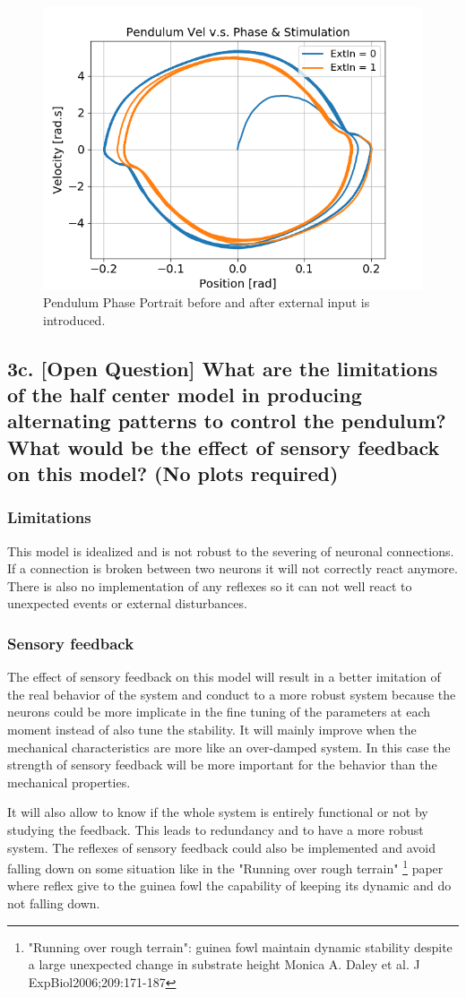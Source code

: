 \documentclass{cmc}
\begin{document}
\begin{figure}[H]
      \centering
      \includegraphics[width=.7\textwidth]{3b/3b-phase.png}
      \caption{Pendulum Phase Portrait before and after external input is introduced.}
      \label{fig:3b_VelocityPhaseSimulations}
\end{figure}

\subsection*{3c. [Open Question] What are the limitations of the half center model in producing alternating patterns to control the pendulum? What would be the effect of sensory feedback on this model? (No plots required)}
  
\subsubsection*{Limitations}
This model is idealized and is not robust to the severing of neuronal connections. If a connection is broken between two neurons it will not correctly react anymore. There is also no implementation of any reflexes so it can not well react to unexpected events or external disturbances. 

\subsubsection*{Sensory feedback}
The effect of sensory feedback on this model will result in a better imitation of the real behavior of the system and conduct to a more robust system because the neurons could be more implicate in the fine tuning of the parameters at each moment instead of also tune the stability. It will mainly improve when the mechanical characteristics are more like an over-damped system. In this case the strength of sensory feedback will be more important for the behavior than the mechanical properties.

It will also allow to know if the whole system is entirely functional or not by studying the feedback. This leads to redundancy and to have a more robust system. The reflexes of sensory feedback could also be implemented and avoid falling down on some situation like in the "Running over rough terrain" \footnote{"Running over rough terrain": guinea fowl maintain dynamic stability despite a large unexpected change in substrate height Monica A. Daley et al. J ExpBiol2006;209:171-187} paper where reflex give to the guinea fowl the capability of keeping its dynamic and do not falling down.
\end{document}
